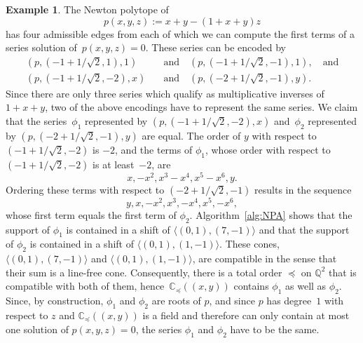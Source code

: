 \documentclass[a4paper,draft]{amsart}
\theoremstyle{definition}
\newtheorem{Example}{Example}
\begin{document}
\begin{Example}\label{ex:nonUniqueness}
The Newton polytope of 
\begin{equation*}
p(x,y,z):= x+y - (1+x+y) z
\end{equation*}
has four admissible edges from each of which we can compute the first terms of a series solution of~$p(x,y,z) = 0$. These series can be encoded by 
\begin{align*}
(p, (-1+1/\sqrt{2},1),1) \quad  &\text{and} \quad (p, (-1+1/\sqrt{2},-1),1), \quad \text{and}\\ 
(p, (-1+1/\sqrt{2},-2),x) \quad &\text{and} \quad (p, (-2+1/\sqrt{2},-1),y).
\end{align*}
Since there are only three series which qualify as multiplicative inverses of $1+x+y$, two of the above encodings have to represent the same series. We claim that the series~$\phi_1$ represented by $(p, (-1+1/\sqrt{2},-2),x)$ and~$\phi_2$ represented by $(p, (-2+1/\sqrt{2},-1),y)$ are equal. The order of $y$ with respect to~$(-1+1/\sqrt{2},-2)$ is $-2$, and the terms of $\phi_1$, whose order with respect to~$(-1+1/\sqrt{2},-2)$ is at least~$-2$, are
\begin{equation*}
x,-x^2,x^3-x^4,x^5-x^6,y.
\end{equation*}
Ordering these terms with respect to $(-2+1/\sqrt{2},-1)$ results in the sequence
\begin{equation*}
y,x,-x^2,x^3,-x^4,x^5,-x^6,
\end{equation*}
whose first term equals the first term of $\phi_2$. Algorithm~\ref{alg:NPA} shows that the support of $\phi_1$ is contained in a shift of $\langle (0,1),(7,-1) \rangle$ and that the support of $\phi_2$ is contained in a shift of $\langle(0,1),(1,-1) \rangle$. These cones, $\langle (0,1),(7,-1) \rangle$ and $\langle(0,1),(1,-1) \rangle$, are compatible in the sense that their sum is a line-free cone. Consequently, there is a total order $\preceq$ on $\mathbb{Q}^2$ that is compatible with both of them, hence~$\mathbb{C}_{\preceq}((x,y))$ contains $\phi_1$ as well as $\phi_2$. Since, by construction, $\phi_1$ and $\phi_2$ are roots of $p$, and since $p$ has degree~$1$ with respect to $z$ and $\mathbb{C}_{\preceq}((x,y))$ is a field and therefore can only contain at most one solution of $p(x,y,z) = 0$, the series $\phi_1$ and $\phi_2$ have to be the same. 
\end{Example}
\end{document}

